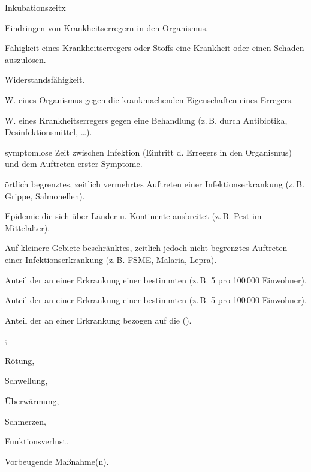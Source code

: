 \begin{labeling}[:]{Inkubationszeitx}
  \item[\T{Infektion}]
  Eindringen von Krankheitserregern in den Organismus.
  \item[\T{Pathogenität}] 
  Fähigkeit eines Krankheitserregers oder Stoffs eine
  Krankheit oder einen Schaden auszulösen.
  \item[\T{Resistenz}]
  \begin{inparadesc}
    \item[Allg.:] Widerstandsfähigkeit.
    \item[Spez.:]
    \begin{inparaenum}
      \item W. eines Organismus gegen die
      krankmachenden Eigenschaften eines Erregers.
      \item W. eines Krankheitserregers gegen eine Behandlung (z.\,B.
      durch Antibiotika, Desinfektionsmittel, \ldots{}).
    \end{inparaenum}
  \end{inparadesc}
  \item[\T{Inkubationszeit}]
  symptomlose Zeit zwischen Infektion (Eintritt d.
  Erregers in den Organismus) und dem Auftreten erster
  Symptome.
  \item[\T{Epidemie}]
  örtlich begrenztes, zeitlich vermehrtes Auftreten einer 
  Infektionserkrankung (z.\,B. Grippe, Salmonellen).
  \item[\T{Pandemie}]
  Epidemie die sich über Länder u. Kontinente ausbreitet
  (z.\,B. Pest im Mittelalter).
  \item[\T{Endemie}]
  Auf kleinere Gebiete beschränktes, zeitlich jedoch nicht
  begrenztes Auftreten einer Infektionserkrankung  (z.\,B.
  FSME,
  Malaria, Lepra).
  \item[\T{Morbidität}]
  Anteil der an einer Erkrankung  einer bestimmten
   (z.\,B. 5 pro 100\,000 Einwohner).
  \item[\T{Mortalität}]
  Anteil der an einer Erkrankung  einer
  bestimmten  (z.\,B. 5 pro 100\,000
  Einwohner).
  \item[\T{Letalität}]
  Anteil der  an einer Erkrankung  bezogen
  auf die  ().
  \item[\T{Entzündung}] ;
  \begin{inparaenum}
    \item Rötung,
    \item Schwellung,
    \item Überwärmung,
    \item Schmerzen,
    \item Funktionsverlust.
  \end{inparaenum}
  \item[\T{Prophylaxe}] 
  Vorbeugende Maßnahme(n).
\end{labeling}

